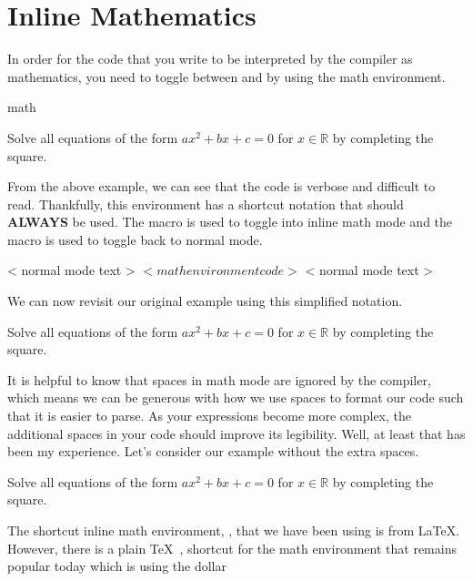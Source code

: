 \section{Inline Mathematics}
 In order for the code
that you write to be interpreted by the compiler as mathematics, you need
to toggle between  and  by using the
math environment.
\begin{docEnvironment*}[doclang/environment content=mathematics content goes here]{math}{}{}
\begin{dispExample}
Solve all equations of the form 
\begin{math} 
  ax^2 + bx + c = 0 
\end{math}
for 
\begin{math} 
  x \in \mathbb{R} 
\end{math} 
by completing the square.
\end{dispExample}
From the above example, we can see that the code is verbose and difficult to
read.  Thankfully, this environment has a shortcut notation that should 
\textbf{ALWAYS} be used.  The macro \cs{(} is used to toggle into inline math mode 
and the macro \cs{)} is used to toggle back to normal mode. 
\begin{dispListing}
< normal mode text > \( < math environment code > \) < normal mode text > 
\end{dispListing}
We can now revisit our original example using this simplified notation.
\begin{dispExample}
Solve all equations of the form \( ax^2 + bx + c = 0 \) 
for \( x \in \mathbb{R} \) by completing the square.
\end{dispExample}
It is helpful to know that spaces in math mode are ignored by the 
compiler, which means we can be generous with how we use spaces to format
our code such that it is easier to parse. As your expressions become more 
complex, the additional spaces in your code should improve its legibility.  
Well, at least that has been my experience.  Let's consider our
example without the extra spaces.
\begin{dispExample}
Solve all equations of the form \(ax^2+bx+c=0\) for
\(x\in\mathbb{R}\) by completing the square.
\end{dispExample}
The shortcut inline math environment, \cs{(}\cs{)}, that we 
have been using is from \LaTeX.  However, there is a plain \TeX\ , shortcut
for the math environment that remains popular today which is using the dollar

\end{docEnvironment*}
